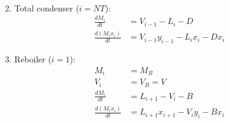 \begin{enumerate}[label = \roman*)]
\begin{align}
		\end{align}
	\item Total condenser ($i = NT$):
		\begin{align}
			\frac{dM_i}{dt}&=V_{i-1}-L_i-D\\
			\frac{d(M_ix_i)}{dt}&=V_{i-1}y_{i-1}-L_ix_i-Dx_i
		\end{align}
	\item Reboiler ($i=1$):
		\begin{align}
			M_i&=M_B\\
			V_i&=V_B=V\\
			\frac{dM_i}{dt}&=L_{i+1}-V_i-B\\
			\frac{d(M_ix_i)}{dt}&=L_{i+1}x_{i+1}-V_iy_i-Bx_i
		\end{align}
\end{enumerate}
